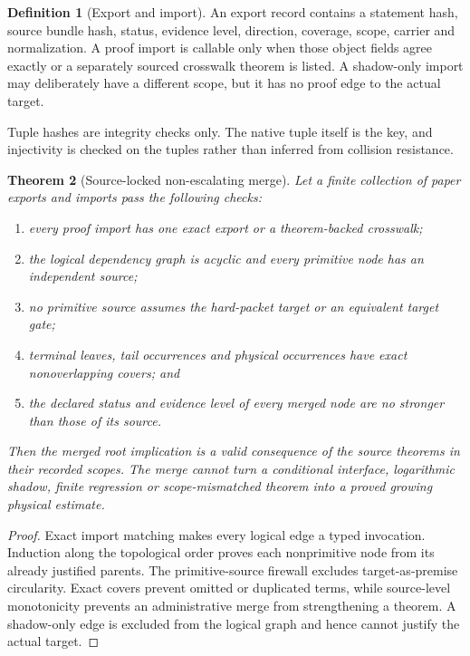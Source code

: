 \documentclass[11pt]{article}
\newtheorem{theorem}{Theorem}[section]
\theoremstyle{definition}
\newtheorem{definition}[theorem]{Definition}
\theoremstyle{remark}
\begin{document}
\begin{definition}[Export and import]
An export record contains a statement hash, source bundle hash,
status, evidence level, direction, coverage, scope, carrier and
normalization.  A proof import is callable only when those object
fields agree exactly or a separately sourced crosswalk theorem is
listed.  A shadow-only import may deliberately have a different
scope, but it has no proof edge to the actual target.
\end{definition}

Tuple hashes are integrity checks only.  The native tuple itself is
the key, and injectivity is checked on the tuples rather than inferred
from collision resistance.

\begin{theorem}[Source-locked non-escalating merge]
\label{thm:merge}
Let a finite collection of paper exports and imports pass the
following checks:
\begin{enumerate}[label=(\roman*),leftmargin=2.2em]
\item every proof import has one exact export or a theorem-backed
  crosswalk;
\item the logical dependency graph is acyclic and every primitive
  node has an independent source;
\item no primitive source assumes the hard-packet target or an
  equivalent target gate;
\item terminal leaves, tail occurrences and physical occurrences
  have exact nonoverlapping covers; and
\item the declared status and evidence level of every merged node are
  no stronger than those of its source.
\end{enumerate}
Then the merged root implication is a valid consequence of the
source theorems in their recorded scopes.  The merge cannot turn a
conditional interface, logarithmic shadow, finite regression or
scope-mismatched theorem into a proved growing physical estimate.
\end{theorem}

\begin{proof}
Exact import matching makes every logical edge a typed invocation.
Induction along the topological order proves each nonprimitive node
from its already justified parents.  The primitive-source firewall
excludes target-as-premise circularity.  Exact covers prevent omitted
or duplicated terms, while source-level monotonicity prevents an
administrative merge from strengthening a theorem.  A shadow-only
edge is excluded from the logical graph and hence cannot justify the
actual target.
\end{proof}
\end{document}
